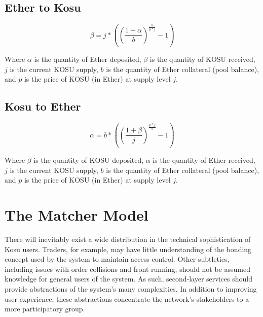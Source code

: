 \documentclass[10pt]{article}
\begin{document}
\subsection{Ether to Kosu}\label{token-distribution-eth-kosu}
\begin{equation}
  \beta = j* ((\frac{1+\alpha}{b})^{\frac{b}{p*j}} - 1)
\end{equation}
\medskip

Where $\alpha$ is the quantity of Ether deposited, $\beta$ is the quantity of KOSU received, $j$ is the current KOSU supply, $b$ is the quantity of Ether collateral (pool balance), and $p$ is the price of KOSU (in Ether) at supply level $j$. 
\subsection{Kosu to Ether}\label{token-distribution-kosu-eth}
\begin{equation}
  \alpha = b* ((\frac{1+\beta}{j})^{\frac{p*j}{b}} - 1)
\end{equation}
\medskip

Where $\beta$ is the quantity of KOSU deposited, $\alpha$ is the quantity of Ether received, $j$ is the current KOSU supply, $b$ is the quantity of Ether collateral (pool balance), and $p$ is the price of KOSU (in Ether) at supply level $j$. 
\clearpage
\pagebreak


\section{The Matcher Model}\label{matcher-model}
There will inevitably exist a wide distribution in the technical sophistication of Kosu users. Traders, for example, may have little understanding of the bonding concept used by the system to maintain access control. Other subtleties, including issues with order collisions and front running, should not be assumed knowledge for general users of the system. As such, second-layer services should provide abstractions of the system’s many complexities. In addition to improving user experience, these abstractions concentrate the network's stakeholders to a more participatory group.
\medskip 
\end{document}
